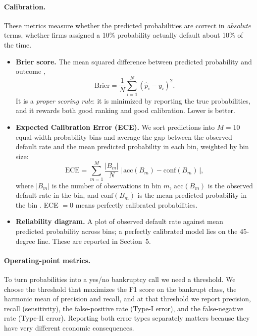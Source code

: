 \documentclass[12pt,a4paper]{article}
\begin{document}
\paragraph{Calibration.} These metrics measure whether the predicted
probabilities are correct in \emph{absolute} terms, whether firms assigned
a 10\% probability actually default about 10\% of the time.
\begin{itemize}
\item \textbf{Brier score.} The mean squared difference between predicted
probability and outcome \citep{brier1950},
\begin{equation}
\text{Brier} = \frac{1}{N} \sum_{i=1}^{N} (\hat{p}_i - y_i)^2 .
\label{eq:brier}
\end{equation}
It is a \emph{proper scoring rule}: it is minimized by reporting the true
probabilities, and it rewards both good ranking and good calibration. Lower
is better.

\item \textbf{Expected Calibration Error (ECE).} We sort predictions into
$M = 10$ equal-width probability bins and average the gap between the observed
default rate and the mean predicted probability in each bin, weighted by bin
size:
\begin{equation}
\text{ECE} = \sum_{m=1}^{M} \frac{|B_m|}{N}
\,\big|\, \text{acc}(B_m) - \text{conf}(B_m) \,\big| ,
\label{eq:ece}
\end{equation}
where $|B_m|$ is the number of observations in bin $m$, $\text{acc}(B_m)$ is
the observed default rate in the bin, and $\text{conf}(B_m)$ is the mean
predicted probability in the bin \citep{guo2017}. ECE $= 0$ means perfectly
calibrated probabilities.

\item \textbf{Reliability diagram.} A plot of observed default rate against
mean predicted probability across bins; a perfectly calibrated model lies on
the 45-degree line. These are reported in Section~5.
\end{itemize}

\paragraph{Operating-point metrics.} To turn probabilities into a yes/no
bankruptcy call we need a threshold. We choose the threshold that maximizes
the F1 score on the bankrupt class, the harmonic mean of precision and
recall, and at that threshold we report precision, recall (sensitivity),
the false-positive rate (Type-I error), and the false-negative rate (Type-II
error). Reporting both error types separately matters because they have very
different economic consequences.
\end{document}
